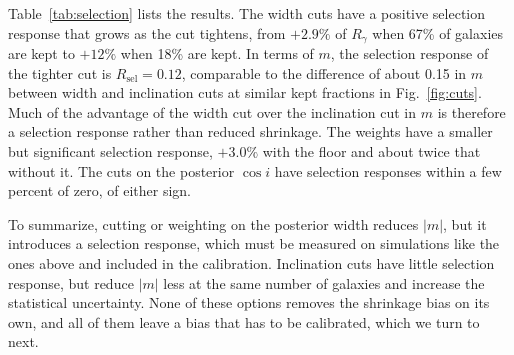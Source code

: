 Table~\ref{tab:selection} lists the results. The width cuts have a positive selection response that grows as the cut tightens, from $+2.9\%$ of $R_\gamma$ when 67\% of galaxies are kept to $+12\%$ when 18\% are kept. In terms of $m$, the selection response of the tighter cut is $R_\mathrm{sel} = 0.12$, comparable to the difference of about 0.15 in $m$ between width and inclination cuts at similar kept fractions in Fig.~\ref{fig:cuts}. Much of the advantage of the width cut over the inclination cut in $m$ is therefore a selection response rather than reduced shrinkage. The weights have a smaller but significant selection response, $+3.0\%$ with the floor and about twice that without it. The cuts on the posterior $\cos i$ have selection responses within a few percent of zero, of either sign.

To summarize, cutting or weighting on the posterior width reduces $|m|$, but it introduces a selection response, which must be measured on simulations like the ones above and included in the calibration. Inclination cuts have little selection response, but reduce $|m|$ less at the same number of galaxies and increase the statistical uncertainty. None of these options removes the shrinkage bias on its own, and all of them leave a bias that has to be calibrated, which we turn to next. 
